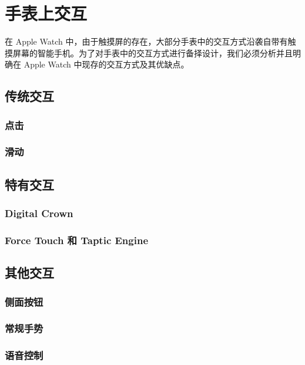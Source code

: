 \chapter{手表上交互}

在 Apple Watch 中，由于触摸屏的存在，大部分手表中的交互方式沿袭自带有触摸屏幕的智能手机。为了对手表中的交互方式进行备择设计，我们必须分析并且明确在 Apple Watch 中现存的交互方式及其优缺点。

\section{传统交互}

\subsection{点击}

\subsection{滑动}

\section{特有交互}

\subsection{Digital Crown}

\subsection{Force Touch 和 Taptic Engine}

\section{其他交互}

\subsection{侧面按钮}

\subsection{常规手势}

\subsection{语音控制}
